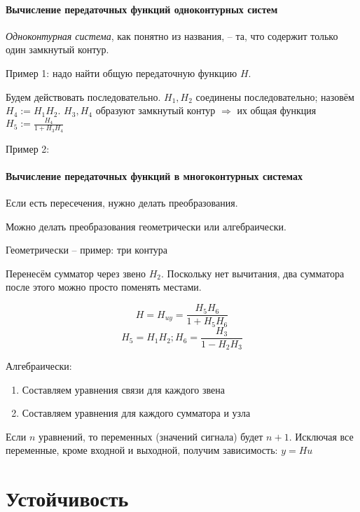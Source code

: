 \documentclass[main.tex]{subfiles}
\begin{document}
\subsubsection{Вычисление передаточных функций одноконтурных систем}

\emph{Одноконтурная система}, как понятно из названия, -- та, что содержит только один замкнутый контур.


Пример 1: надо найти общую передаточную функцию $ H $.

Будем действовать последовательно.
$ H_1, H_2 $ соединены последовательно; назовём $ H_4 := H_1 H_2 $.
$ H_3, H_4 $ образуют замкнутый контур $ \Rightarrow $ их общая функция $ H_5 := \frac{H_4}{1 + H_3 H_4} $

Пример 2:


\subsubsection{Вычисление передаточных функций в многоконтурных системах}

Если есть пересечения, нужно делать преобразования.

Можно делать преобразования геометрически или алгебраически.

Геометрически -- пример: три контура


Перенесём сумматор через звено $ H_2 $.
Поскольку нет вычитания, два сумматора после этого можно просто поменять местами.


$$ H = H_{uy} = \frac{H_5 H_6}{1 + H_5 H_6} $$
$$ H_5 = H_1 H_2; H_6 = \frac{H_3}{1 - H_2 H_3} $$

Алгебраически:
\begin{enumerate}[noitemsep]
    \item Составляем уравнения связи для каждого звена
    \item Составляем уравнения для каждого сумматора и узла
\end{enumerate}

Если $ n $ уравнений, то переменных (значений сигнала) будет $ n + 1 $.
Исключая все переменные, кроме входной и выходной, получим зависимость: $ y = Hu $


\chapter{Устойчивость}
\end{document}
